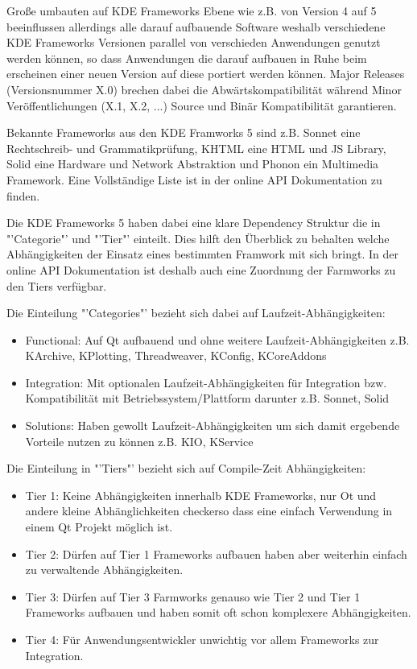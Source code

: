 \documentclass[10pt,a4paper,twocolumn]{article}
\begin{document}
Große umbauten auf KDE Frameworks Ebene wie z.B. von Version 4 auf 5 beeinflussen allerdings alle darauf aufbauende Software weshalb verschiedene KDE Frameworks Versionen parallel von verschieden Anwendungen genutzt werden können, so dass Anwendungen die darauf aufbauen in Ruhe beim erscheinen einer neuen Version auf diese portiert werden können. Major Releases (Versionsnummer X.0) brechen dabei die Abwärtskompatibilität während Minor Veröffentlichungen (X.1, X.2, ...) Source und Binär Kompatibilität garantieren.

Bekannte Frameworks aus den KDE Framworks 5 sind z.B. Sonnet eine Rechtschreib- und Grammatikprüfung, KHTML eine HTML und JS Library, Solid eine Hardware und Network Abstraktion und Phonon ein Multimedia Framework. Eine Vollständige Liste ist in der online API Dokumentation zu finden.

Die KDE Frameworks 5 haben dabei eine klare Dependency Struktur die in "'Categorie"' und "'Tier"' einteilt. Dies hilft den Überblick zu behalten welche Abhängigkeiten der Einsatz eines bestimmten Framwork mit sich bringt. In der online API Dokumentation ist deshalb auch eine Zuordnung der Farmworks zu den Tiers verfügbar.

Die Einteilung "'Categories"' bezieht sich dabei auf Laufzeit-Abhängigkeiten:
\begin{itemize}
\setlength\itemsep{0em}
\item Functional: Auf Qt aufbauend und ohne weitere Laufzeit-Abhängigkeiten z.B. KArchive, KPlotting, Threadweaver, KConfig, KCoreAddons

\item Integration: Mit optionalen Laufzeit-Abhängigkeiten für Integration bzw. Kompatibilität mit Betriebssystem/Plattform darunter z.B. Sonnet, Solid

\item Solutions: Haben gewollt Laufzeit-Abhängigkeiten um sich damit ergebende Vorteile nutzen zu können z.B. KIO, KService
\end{itemize}

Die Einteilung in "'Tiers"' bezieht sich auf Compile-Zeit Abhängigkeiten:
\begin{itemize}
\setlength\itemsep{0em}
\item Tier 1: Keine Abhängigkeiten innerhalb KDE Frameworks, nur Ot und andere kleine Abhänglichkeiten  checkerso dass eine einfach Verwendung in einem Qt Projekt möglich ist. 

\item Tier 2: Dürfen auf Tier 1 Frameworks aufbauen haben aber weiterhin einfach zu verwaltende Abhängigkeiten.

\item Tier 3: Dürfen auf Tier 3 Farmworks genauso wie Tier 2 und Tier 1 Frameworks aufbauen und haben somit oft schon komplexere Abhängigkeiten.

\item Tier 4: Für Anwendungsentwickler unwichtig vor allem Frameworks zur Integration. 
\end{itemize}
\end{document}
